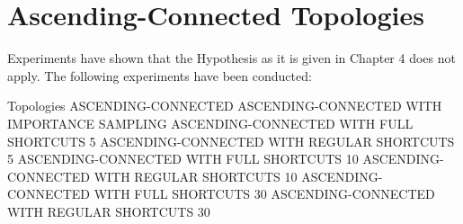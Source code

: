 \documentclass[Bachelorarbeit.tex]{subfiles}
\begin{document}
\section{Ascending-Connected Topologies} 
Experiments have shown that the Hypothesis as it is given in Chapter 4 does not apply. The following experiments have been conducted:

Topologies
ASCENDING-CONNECTED
ASCENDING-CONNECTED WITH IMPORTANCE SAMPLING
ASCENDING-CONNECTED WITH FULL SHORTCUTS 5
ASCENDING-CONNECTED WITH REGULAR SHORTCUTS 5
ASCENDING-CONNECTED WITH FULL SHORTCUTS 10
ASCENDING-CONNECTED WITH REGULAR SHORTCUTS 10
ASCENDING-CONNECTED WITH FULL SHORTCUTS 30
ASCENDING-CONNECTED WITH REGULAR SHORTCUTS 30
\end{document}
